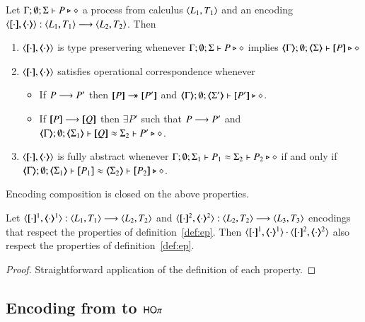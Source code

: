 \begin{definition}
	\label{def:ep}
	Let $\Gamma; \emptyset; \Sigma \vdash P \triangleright \diamond$ 
	a process from calculus $\langle L_1, T_1 \rangle$
	and an encoding 
	$\enc{\cdot}{\cdot}: \calc{L_1}{T_1} \longrightarrow \calc{L_2}{T_2}$.
	Then
	\begin{enumerate}
		\item	$\enc{\cdot}{\cdot}$ is type preservering whenever
			$\Gamma; \emptyset; \Sigma \vdash P \triangleright \diamond$ implies $\mapt{\Gamma}; \emptyset; \mapt{\Sigma} \proves \map{P} \hastype \Proc$

		\item	$\enc{\cdot}{\cdot}$ satisfies operational correspondence whenever
		\begin{itemize}
			\item	If $P \longrightarrow P'$ then
				$\map{P} \Red \map{P'}$ and
				$\mapt{\Gamma}; \emptyset; \mapt{\Sigma'} \proves \map{P'} \hastype \Proc$.
			\item	If $\map{P} \red \map{Q}$ then
				$\exists P'$ such that $P \longrightarrow P'$ and 
				$\mapt{\Gamma};\emptyset; \mapt{\Sigma_1} \proves \map{Q} \wb \Sigma_2 \proves P' \hastype \Proc$.
		\end{itemize}
		
		\item	$\enc{\cdot}{\cdot}$ is fully abstract whenever
			$\Gamma; \emptyset; \Sigma_1 \vdash P_1 \approx \Sigma_2 \vdash P_2 \triangleright \diamond$ if and only if
			$\mapt{\Gamma}; \emptyset; \mapt{\Sigma_1} \proves \map{P_1} \wb \mapt{\Sigma_2} \proves \map{P_2} \hastype \Proc$.
	\end{enumerate}
\end{definition}

Encoding composition is closed on the above properties.

\begin{proposition}
	Let $\encod{\cdot}{\cdot}{1}: \calc{L_1}{T_1} \longrightarrow \calc{L_2}{T_2}$ and 
	$\encod{\cdot}{\cdot}{2}: \calc{L_2}{T_2} \longrightarrow \calc{L_3}{T_3}$
	encodings that respect the properties of definition~\ref{def:ep}.
	Then $\encod{\cdot}{\cdot}{1} \cdot \encod{\cdot}{\cdot}{2}$
	also respect the properties of definition~\ref{def:ep}.
\end{proposition}

\begin{proof}
	Straightforward application of the definition of each property.
\end{proof}

\subsection{Encoding from \sesp to $\mathsf{HO}\pi$}

